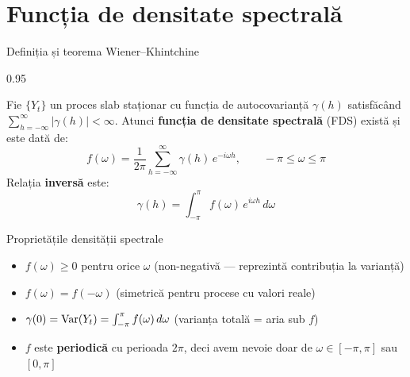 \documentclass[9pt, aspectratio=169, t]{beamer}
\begin{document}
\section{Funcția de densitate spectrală}

\begin{frame}{Definiția și teorema Wiener--Khintchine}
    \begin{cminipage}{0.95\textwidth}
    \vspace{-2mm}
    \begin{thm}
        {\small Fie $\{Y_t\}$ un proces slab staționar cu funcția de autocovarianță $\gamma(h)$ satisfăcând $\sum_{h=-\infty}^{\infty} |\gamma(h)| < \infty$. Atunci \textbf{funcția de densitate spectrală} (FDS) există și este dată de:
        \[
            f(\omega) = \frac{1}{2\pi} \sum_{h=-\infty}^{\infty} \gamma(h) \, e^{-i\omega h}, \qquad -\pi \leq \omega \leq \pi
        \]
        Relația \textbf{inversă} este:
        \[
            \gamma(h) = \int_{-\pi}^{\pi} f(\omega) \, e^{i\omega h}\,d\omega
        \]}
    \end{thm}
    \vspace{-2mm}
    \begin{block}{Proprietățile densității spectrale}
        \begin{itemize}\setlength{\itemsep}{0pt}
            \item $f(\omega) \geq 0$ pentru orice $\omega$ (non-negativă --- reprezintă contribuția la varianță)
            \item $f(\omega) = f(-\omega)$ (simetrică pentru procese cu valori reale)
            \item $\gamma(0) = \text{Var}(Y_t) = \int_{-\pi}^{\pi} f(\omega)\,d\omega$ (varianța totală = aria sub $f$)
            \item $f$ este \textbf{periodică} cu perioada $2\pi$, deci avem nevoie doar de $\omega \in [-\pi, \pi]$ sau $[0, \pi]$
        \end{itemize}
    \end{block}
    \end{cminipage}
\end{frame}
\end{document}
